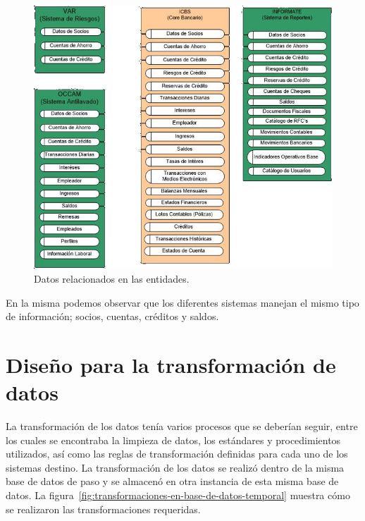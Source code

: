 \begin{figure}[htb]
  \begin{center}
    \includegraphics[width=\linewidth]{Relacion_entidades.jpg}
        \caption{Datos relacionados en las entidades.}
    \label{fig:datos-relacionados-en-las-entidades}
  \end{center}
\end{figure}

En la misma podemos observar que los diferentes sistemas manejan el mismo tipo
de información; socios, cuentas, créditos y saldos.

\section{Diseño para la transformación de datos}

La transformación de los datos tenía varios procesos que se deberían seguir,
entre los cuales se encontraba la limpieza de datos, los estándares y
procedimientos utilizados, así como las reglas de transformación definidas para
cada uno de los sistemas destino. La transformación de los datos se realizó
dentro de la misma base de datos de paso y se almacenó en otra instancia de esta
misma base de datos. La
figura~\ref{fig:transformaciones-en-base-de-datos-temporal} muestra cómo se
realizaron las transformaciones requeridas.

